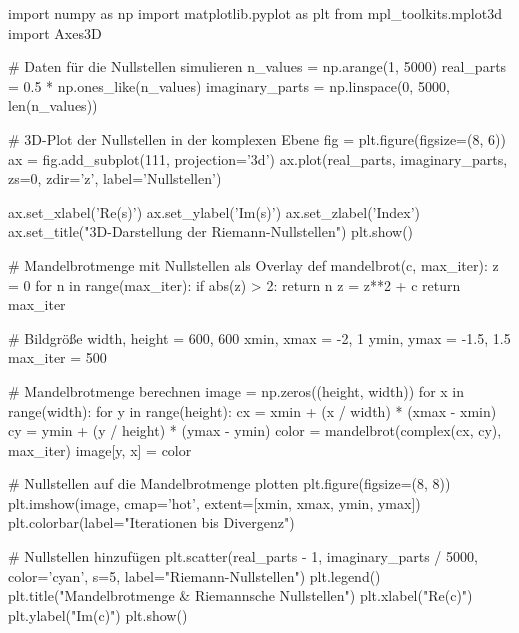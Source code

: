 import numpy as np
import matplotlib.pyplot as plt
from mpl_toolkits.mplot3d import Axes3D

# Daten für die Nullstellen simulieren
n_values = np.arange(1, 5000)
real_parts = 0.5 * np.ones_like(n_values)
imaginary_parts = np.linspace(0, 5000, len(n_values))

# 3D-Plot der Nullstellen in der komplexen Ebene
fig = plt.figure(figsize=(8, 6))
ax = fig.add_subplot(111, projection='3d')
ax.plot(real_parts, imaginary_parts, zs=0, zdir='z', label='Nullstellen')

ax.set_xlabel('Re(s)')
ax.set_ylabel('Im(s)')
ax.set_zlabel('Index')
ax.set_title("3D-Darstellung der Riemann-Nullstellen")
plt.show()

# Mandelbrotmenge mit Nullstellen als Overlay
def mandelbrot(c, max_iter):
    z = 0
    for n in range(max_iter):
        if abs(z) > 2:
            return n
        z = z**2 + c
    return max_iter

# Bildgröße
width, height = 600, 600
xmin, xmax = -2, 1
ymin, ymax = -1.5, 1.5
max_iter = 500

# Mandelbrotmenge berechnen
image = np.zeros((height, width))
for x in range(width):
    for y in range(height):
        cx = xmin + (x / width) * (xmax - xmin)
        cy = ymin + (y / height) * (ymax - ymin)
        color = mandelbrot(complex(cx, cy), max_iter)
        image[y, x] = color

# Nullstellen auf die Mandelbrotmenge plotten
plt.figure(figsize=(8, 8))
plt.imshow(image, cmap='hot', extent=[xmin, xmax, ymin, ymax])
plt.colorbar(label="Iterationen bis Divergenz")

# Nullstellen hinzufügen
plt.scatter(real_parts - 1, imaginary_parts / 5000, color='cyan', s=5, label="Riemann-Nullstellen")
plt.legend()
plt.title("Mandelbrotmenge & Riemannsche Nullstellen")
plt.xlabel("Re(c)")
plt.ylabel("Im(c)")
plt.show()